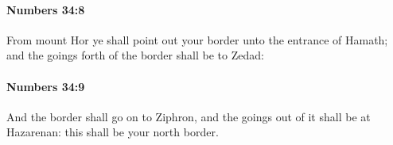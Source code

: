 		\paragraph{Numbers 34:8} %
			\label{NUMBERS-34-8}

			From mount Hor ye shall point out your border unto the entrance of Hamath; and the goings forth of the border shall be to Zedad:


		\paragraph{Numbers 34:9} %
			\label{NUMBERS-34-9}

			And the border shall go on to Ziphron, and the goings out of it shall be at Hazarenan: this shall be your north border.


